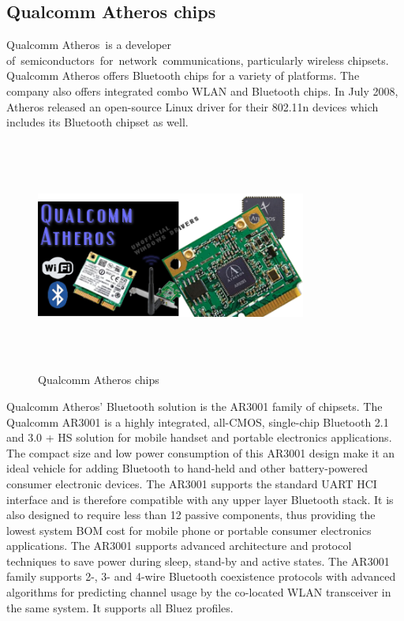 \subsection{Qualcomm Atheros chips}
Qualcomm Atheros is a developer of semiconductors for network communications, particularly wireless chipsets. Qualcomm Atheros offers Bluetooth chips for a variety of platforms. The company also offers integrated combo WLAN and Bluetooth chips. In July 2008, Atheros released an open-source Linux driver for their 802.11n devices which includes its Bluetooth chipset as well. 
\begin{figure}[ht]
	\centering
	\includegraphics[width=3.5in, height=3in]{images/qualcomm_atheros.png}
	\caption{Qualcomm Atheros chips}
\end{figure}
Qualcomm Atheros’ Bluetooth solution is the AR3001 family of chipsets. The Qualcomm AR3001 is a highly integrated, all-CMOS, single-chip Bluetooth 2.1 and 3.0 + HS solution for mobile handset and portable electronics applications. The compact size and low power consumption of this AR3001 design make it an ideal vehicle for adding Bluetooth to hand-held and other battery-powered consumer electronic devices. The AR3001 supports the standard UART HCI interface and is therefore compatible with any upper layer Bluetooth stack. It is also designed to require less than 12 passive components, thus providing the lowest system BOM cost for mobile phone or portable consumer electronics applications. The AR3001 supports advanced architecture and protocol techniques to save power during sleep, stand-by and active states. The AR3001 family supports 2-, 3- and 4-wire Bluetooth coexistence protocols with advanced algorithms for predicting channel usage by the co-located WLAN transceiver in the same system. It supports all Bluez profiles. 
